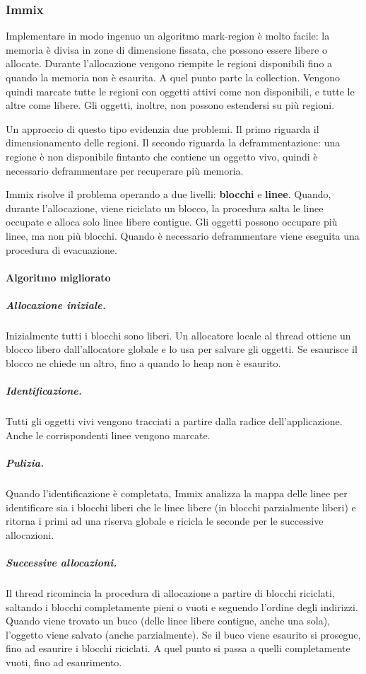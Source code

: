 \subsubsection{Immix}
Implementare in modo ingenuo un algoritmo mark-region è molto facile: la memoria è divisa in zone di dimensione fissata, che possono essere libere o allocate. Durante l'allocazione vengono riempite le regioni disponibili fino a quando la memoria non è esaurita. A quel punto parte la collection. Vengono quindi marcate tutte le regioni con oggetti attivi come non disponibili, e tutte le altre come libere. Gli oggetti, inoltre, non possono estendersi su più regioni. 

Un approccio di questo tipo evidenzia due problemi. Il primo riguarda il dimensionamento delle regioni. Il secondo riguarda la deframmentazione: una regione è non disponibile fintanto che contiene un oggetto vivo, quindi è necessario deframmentare per recuperare più memoria.

Immix risolve il problema operando a due livelli: \textbf{blocchi} e \textbf{linee}. Quando, durante l'allocazione, viene riciclato un blocco, la procedura salta le linee occupate e alloca solo linee libere contigue. Gli oggetti possono occupare più linee, ma non più blocchi. Quando è necessario deframmentare viene eseguita una procedura di evacuazione.

\paragraph{Algoritmo migliorato} 
\subparagraph{Allocazione iniziale.} Inizialmente tutti i blocchi sono liberi. Un allocatore locale al thread ottiene un blocco libero dall'allocatore globale e lo usa per salvare gli oggetti. Se esaurisce il blocco ne chiede un altro, fino a quando lo heap non è esaurito.
\subparagraph{Identificazione.} Tutti gli oggetti vivi vengono tracciati a partire dalla radice dell'applicazione. Anche le corrispondenti linee vengono marcate.
\subparagraph{Pulizia.} Quando l'identificazione è completata, Immix analizza la mappa delle linee per identificare sia i blocchi liberi che le linee libere (in blocchi parzialmente liberi) e ritorna i primi ad una riserva globale e ricicla le seconde per le successive allocazioni.
\subparagraph{Successive allocazioni.} Il thread ricomincia la procedura di allocazione a partire di blocchi riciclati, saltando i blocchi completamente pieni o vuoti e seguendo l'ordine degli indirizzi. Quando viene trovato un buco (delle linee libere contigue, anche una sola), l'oggetto viene salvato (anche parzialmente). Se il buco viene esaurito si prosegue, fino ad esaurire i blocchi riciclati. A quel punto si passa a quelli completamente vuoti, fino ad esaurimento.

